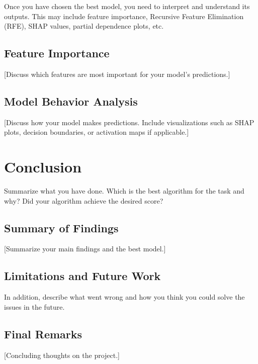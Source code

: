 \documentclass[aps,prl,preprint,groupedaddress]{revtex4-2}
\begin{document}
Once you have chosen the best model, you need to interpret and understand its outputs. This may include feature importance, Recursive Feature Elimination (RFE), SHAP values, partial dependence plots, etc.

\subsection{Feature Importance}
[Discuss which features are most important for your model's predictions.]


\subsection{Model Behavior Analysis}
[Discuss how your model makes predictions. Include visualizations such as SHAP plots, decision boundaries, or activation maps if applicable.]

\section{Conclusion}
\label{sec:conclusion}

Summarize what you have done. Which is the best algorithm for the task and why? Did your algorithm achieve the desired score?

\subsection{Summary of Findings}
[Summarize your main findings and the best model.]

\subsection{Limitations and Future Work}
In addition, describe what went wrong and how you think you could solve the issues in the future.

\subsection{Final Remarks}
[Concluding thoughts on the project.]
\end{document}
